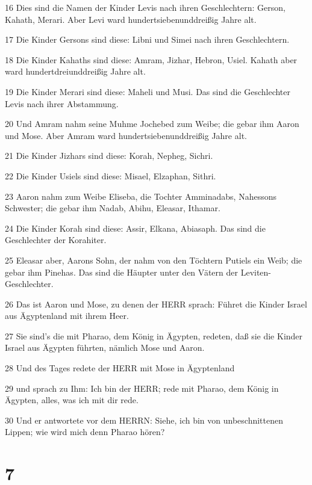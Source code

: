 \par 16 Dies sind die Namen der Kinder Levis nach ihren Geschlechtern: Gerson, Kahath, Merari. Aber Levi ward hundertsiebenunddreißig Jahre alt.
\par 17 Die Kinder Gersons sind diese: Libni und Simei nach ihren Geschlechtern.
\par 18 Die Kinder Kahaths sind diese: Amram, Jizhar, Hebron, Usiel. Kahath aber ward hundertdreiunddreißig Jahre alt.
\par 19 Die Kinder Merari sind diese: Maheli und Musi. Das sind die Geschlechter Levis nach ihrer Abstammung.
\par 20 Und Amram nahm seine Muhme Jochebed zum Weibe; die gebar ihm Aaron und Mose. Aber Amram ward hundertsiebenunddreißig Jahre alt.
\par 21 Die Kinder Jizhars sind diese: Korah, Nepheg, Sichri.
\par 22 Die Kinder Usiels sind diese: Misael, Elzaphan, Sithri.
\par 23 Aaron nahm zum Weibe Eliseba, die Tochter Amminadabs, Nahessons Schwester; die gebar ihm Nadab, Abihu, Eleasar, Ithamar.
\par 24 Die Kinder Korah sind diese: Assir, Elkana, Abiasaph. Das sind die Geschlechter der Korahiter.
\par 25 Eleasar aber, Aarons Sohn, der nahm von den Töchtern Putiels ein Weib; die gebar ihm Pinehas. Das sind die Häupter unter den Vätern der Leviten-Geschlechter.
\par 26 Das ist Aaron und Mose, zu denen der HERR sprach: Führet die Kinder Israel aus Ägyptenland mit ihrem Heer.
\par 27 Sie sind's die mit Pharao, dem König in Ägypten, redeten, daß sie die Kinder Israel aus Ägypten führten, nämlich Mose und Aaron.
\par 28 Und des Tages redete der HERR mit Mose in Ägyptenland
\par 29 und sprach zu Ihm: Ich bin der HERR; rede mit Pharao, dem König in Ägypten, alles, was ich mit dir rede.
\par 30 Und er antwortete vor dem HERRN: Siehe, ich bin von unbeschnittenen Lippen; wie wird mich denn Pharao hören?

\chapter{7}

